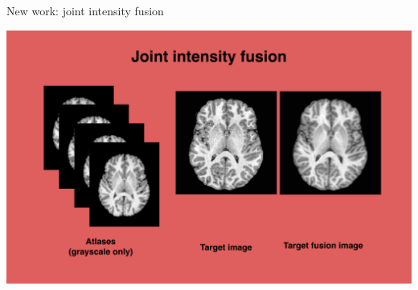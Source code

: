 \documentclass[ignorenonframetext,]{beamer}
\begin{document}
\begin{frame}{New work: joint intensity fusion}

\includegraphics{./tools/jointfusion/figures/jointIntensityFusion.png}

\hypertarget{refs}{}

\end{frame}
\end{document}
